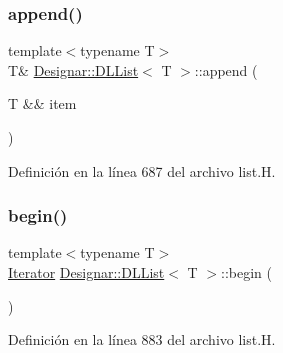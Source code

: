 \mbox{\label{class_designar_1_1_d_l_list_a62918b133f72c5fa1c580f823642e5fa}} 
\subsubsection{\texorpdfstring{append()}{append()}\hspace{0.1cm}{\footnotesize\ttfamily [2/2]}}
{\footnotesize\ttfamily template$<$typename T$>$ \\
T\& \hyperlink{class_designar_1_1_d_l_list}{Designar\+::\+D\+L\+List}$<$ T $>$\+::append (\begin{DoxyParamCaption}\item[{T \&\&}]{item }\end{DoxyParamCaption})\hspace{0.3cm}{\ttfamily [inline]}}



Definición en la línea 687 del archivo list.\+H.

\mbox{\label{class_designar_1_1_d_l_list_a1c011ca480554788280073fcdf6804c6}} 
\subsubsection{\texorpdfstring{begin()}{begin()}\hspace{0.1cm}{\footnotesize\ttfamily [1/2]}}
{\footnotesize\ttfamily template$<$typename T$>$ \\
\hyperlink{class_designar_1_1_d_l_list_1_1_iterator}{Iterator} \hyperlink{class_designar_1_1_d_l_list}{Designar\+::\+D\+L\+List}$<$ T $>$\+::begin (\begin{DoxyParamCaption}{ }\end{DoxyParamCaption})\hspace{0.3cm}{\ttfamily [inline]}}



Definición en la línea 883 del archivo list.\+H.

\mbox{\label{class_designar_1_1_d_l_list_a5fa0fa23f4ab881a04be6786de312dad}} 
